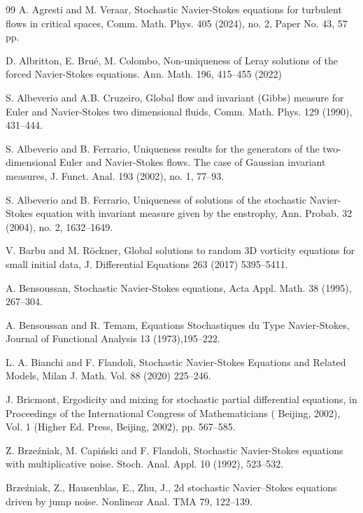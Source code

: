 \documentclass[11pt,reqno]{amsart}
\theoremstyle{definition}
\theoremstyle{remark}
\newcommand{\<}{\langle}
\renewcommand{\>}{\rangle}
\begin{document}
\begin{thebibliography}{99}
 A. Agresti and M. Veraar, Stochastic
 Navier-Stokes equations 
for turbulent flows in critical spaces,  
 Comm. Math. Phys. 405 (2024), no. 2, Paper No. 43, 57 pp. 

D. Albritton, E. Bru\'e, M. Colombo,  
Non-uniqueness of Leray solutions of the forced Navier-Stokes equations.  
Ann. Math. 196, 415--455 (2022)
 
S. Albeverio and A.B. Cruzeiro, Global flow 
and invariant (Gibbs) measure for Euler and Navier-Stokes 
two dimensional fluids, Comm. Math. Phys. 129 (1990), 431--444.

 S. Albeverio and B. Ferrario, 
Uniqueness results for the generators of the two-dimensional 
Euler and Navier-Stokes flows. The case of Gaussian invariant measures,  
J. Funct. Anal. 193 (2002), no. 1, 77--93.

S. Albeverio and B. Ferrario, 
Uniqueness of solutions of the stochastic Navier-Stokes 
equation with invariant measure given by the enstrophy, 
Ann. Probab. 32 (2004), no. 2, 1632--1649.
 

 V. Barbu and M. R\"ockner, 
Global solutions to random 3D vorticity equations for
small initial data, J. Differential Equations 263 (2017) 5395--5411. 

 
A. Bensoussan, 
Stochastic Navier-Stokes equations, Acta Appl. Math. 38 (1995), 267--304.
 

 A. Bensoussan and R. Temam, 
Equations Stochastiques du Type Navier-Stokes, 
Journal of Functional Analysis 13 (1973),195--222. 

 L. A. Bianchi and F. Flandoli,
Stochastic Navier-Stokes Equations and Related Models, 
Milan J. Math. Vol. 88 (2020) 225--246. 

 
J. Bricmont, Ergodicity and mixing for stochastic partial 
differential equations, in Proceedings of the International Congress of Mathematicians (
Beijing, 2002), Vol. 1 (Higher
Ed. Press, Beijing, 2002), pp. 567--585.

Z. Brze\'zniak, M. Capi\'nski and F. Flandoli, 
Stochastic Navier-Stokes equations with multiplicative noise. 
Stoch. Anal. Appl. 10 (1992), 523--532. 

  Brze\'zniak, Z., Hausenblas, E., Zhu, J., 
 2d stochastic Navier–Stokes equations driven by jump noise. 
 Nonlinear Anal. TMA 79, 122--139.
 

\end{thebibliography}
\end{document}
